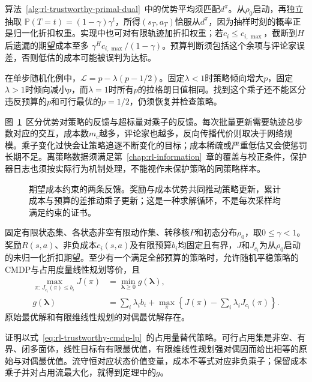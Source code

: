 算法~\ref{alg:rl-trustworthy-primal-dual}~中的优势平均须匹配$d^\pi$。从$\rho_0$启动，再独立抽取
$\mathbb P(T=t)=(1-\gamma)\gamma^t$，所得$(s_T,a_T)$恰服从$d^\pi$，因为抽样时刻的概率正是归一化折扣权重。实现中也可对有限轨迹加折扣权重；若$c_i\leq c_{i,\max}$，截断到$H$后遗漏的期望成本至多
$\gamma^Hc_{i,\max}/(1-\gamma)$。预算判断须包括这个余项与评论家误差，否则低估的成本可能被误判为达标。

在单步随机化例中，$\mathcal L=p-\lambda(p-1/2)$。固定$\lambda<1$时策略倾向增大$p$，固定$\lambda>1$时倾向减小$p$，而$\lambda=1$时所有$p$的拉格朗日值相同。找到这个乘子还不能区分违反预算的$p$和可行最优的$p=1/2$，仍须恢复并检查策略。

图~\ref{fig:rl-trustworthy-primal-dual}~区分优势对策略的反馈与超标量对乘子的反馈。每次批量更新需要轨迹总步数对应的交互，成本数$m_c$越多，评论家也越多，反向传播代价则取决于网络规模。乘子变化过快会让策略追逐不断变化的目标；成本稀疏或严重低估又会使惩罚长期不足。离策略数据须满足第~\ref{chap:rl-information}~章的覆盖与校正条件，保护器日志也须按实际行为机制处理，不能视作未保护策略的同策略样本。

\begin{figure}[htbp]
  \centering
  
  \caption{期望成本约束的两条反馈。奖励与成本优势共同推动策略更新，累计成本与预算的差推动乘子更新；这是一种求解循环，不是每次采样均满足约束的证书。}
  \label{fig:rl-trustworthy-primal-dual}
\end{figure}

\begin{theorem}[有限折扣CMDP的强对偶]
  \label{thm:rl-trustworthy-strong-duality}
  固定有限状态集、各状态非空有限动作集、转移核$P$和初态分布$\rho_0$，取$0\leq\gamma<1$。奖励$R(s,a)$、非负成本$c_i(s,a)$及有限预算$b_i$均固定且有界，$J$和$J_{c_i}$为从$\rho_0$启动的未归一化折扣期望。至少有一个满足全部预算的策略时，允许随机平稳策略的CMDP与占用度量线性规划等价，且
  \[
    \begin{aligned}
      \max_{\pi:\,J_{c_i}(\pi)\leq b_i}J(\pi)
        &=\min_{\bm{\lambda}\geq0}g(\bm{\lambda}),\\
      g(\bm{\lambda})
        &=\sum_i\lambda_i b_i+
          \max_\pi\left\{J(\pi)-\sum_i\lambda_iJ_{c_i}(\pi)\right\}.
    \end{aligned}
  \]
  原始最优解和有限维线性规划的对偶最优解存在。
\end{theorem}

证明以式~\eqref{eq:rl-trustworthy-cmdp-lp}~的占用量替代策略。可行占用集是非空、有界、闭多面体，线性目标有有限最优值，有限维线性规划强对偶因而给出相等的原始与对偶最优值。流守恒对应状态价值变量，成本不等式对应非负乘子；保留成本乘子并对占用流最大化，就得到定理中的$g$。

